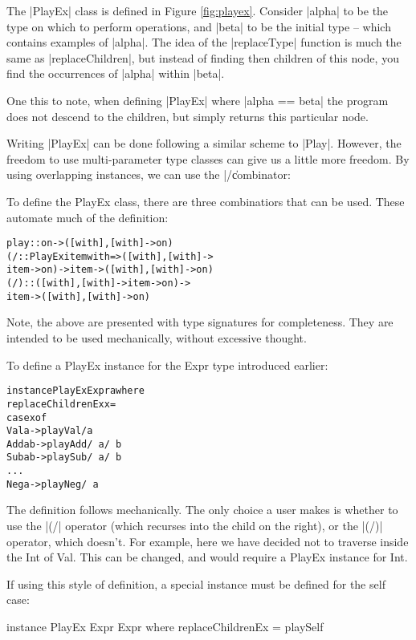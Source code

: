 \documentclass[preprint]{sigplanconf}
\newenvironment{code}{\begin{alltt}\small}{\end{alltt}}
\begin{document}
The |PlayEx| class is defined in Figure \ref{fig:playex}. Consider |alpha| to be the type on which to perform operations, and |beta| to be the initial type -- which contains examples of |alpha|. The idea of the |replaceType| function is much the same as |replaceChildren|, but instead of finding then children of this node, you find the occurrences of |alpha| within |beta|.

One this to note, when defining |PlayEx| where |alpha == beta| the program does not descend to the children, but simply returns this particular node.

Writing |PlayEx| can be done following a similar scheme to |Play|. However, the freedom to use multi-parameter type classes can give us a little more freedom. By using overlapping instances, we can use the |/\| combinator:


To define the PlayEx class, there are three combinatiors that can be used. These automate much of the definition:

\begin{code}
play :: on -> ([with],[with] -> on)
(/\) :: PlayEx item with => ([with], [with] ->
    item -> on) -> item -> ([with], [with] -> on)
(/\!) :: ([with], [with] -> item -> on) ->
    item -> ([with], [with] -> on)
\end{code}

Note, the above are presented with type signatures for completeness. They are intended to be used mechanically, without excessive thought.

To define a PlayEx instance for the Expr type introduced earlier:

\begin{code}
instance PlayEx Expr a where
    replaceChildrenEx x =
        case x of
            Val a -> play Val /\! a
            Add a b -> play Add /\ a /\ b
            Sub a b -> play Sub /\ a /\ b
            ...
            Neg a -> play Neg /\ a
\end{code}

The definition follows mechanically. The only choice a user makes is whether to use the |(/\)| operator (which recurses into the child on the right), or the |(/\!)| operator, which doesn't. For example, here we have decided not to traverse inside the Int of Val. This can be changed, and would require a PlayEx instance for Int.

If using this style of definition, a special instance must be defined for the self case:

instance PlayEx Expr Expr where
    replaceChildrenEx = playSelf
\end{document}
